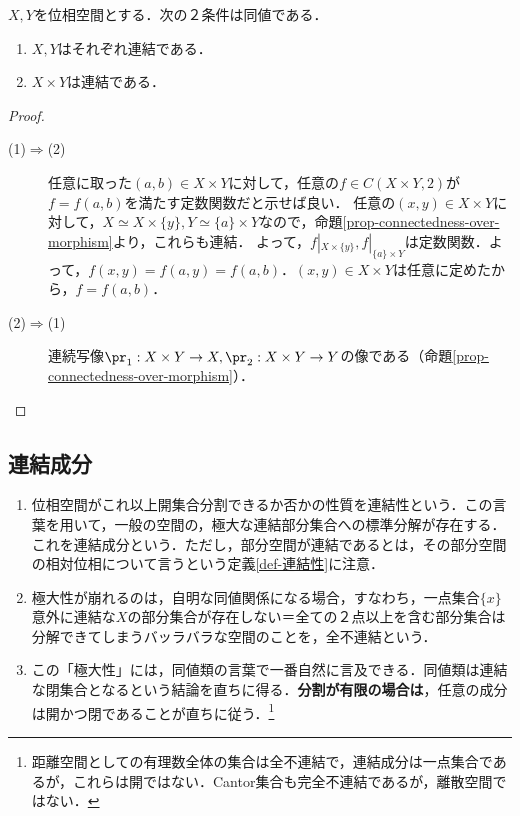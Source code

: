 \documentclass[uplatex,dvipdfmx]{jsreport}
\begin{document}
\begin{corollary}[積への伝播]
    $X,Y$を位相空間とする．次の２条件は同値である．
    \begin{enumerate}
        \item $X,Y$はそれぞれ連結である．
        \item $X\times Y$は連結である．
    \end{enumerate}
\end{corollary}
\begin{proof}\mbox{}
    \begin{description}
        \item[(1)$\Rightarrow$(2)] 
        任意に取った$(a,b)\in X\times Y$に対して，任意の$f\in C(X\times Y,2)$が$f=f(a,b)$を満たす定数関数だと示せば良い．
        任意の$(x,y)\in X\times Y$に対して，$X\simeq X\times\{y\},Y\simeq\{a\}\times Y$なので，命題\ref{prop-connectedness-over-morphism}より，これらも連結．
        よって，$f|_{X\times\{y\}},f|_{\{a\}\times Y}$は定数関数．よって，$f(x,y)=f(a,y)=f(a,b)$．$(x,y)\in X\times Y$は任意に定めたから，$f=f(a,b)$．
        \item[(2)$\Rightarrow$(1)]
        連続写像$\pr_1:X\times Y\to X,\pr_2:X\times Y\to Y$の像である（命題\ref{prop-connectedness-over-morphism}）．
    \end{description}
\end{proof}

\subsection{連結成分}

\begin{tcolorbox}[colframe=ForestGreen, colback=ForestGreen!10!white,breakable,colbacktitle=ForestGreen!40!white,coltitle=black,fonttitle=\bfseries\sffamily,
title=連結成分：連結の中間的・動的な様子を，同値類の言葉で捉える装置．]
    \begin{enumerate}
        \item 位相空間がこれ以上開集合分割できるか否かの性質を連結性という．この言葉を用いて，一般の空間の，極大な連結部分集合への標準分解が存在する．これを連結成分という．ただし，部分空間が連結であるとは，その部分空間の相対位相について言うという定義\ref{def-連結性}に注意．
        \item 極大性が崩れるのは，自明な同値関係になる場合，すなわち，一点集合$\{x\}$意外に連結な$X$の部分集合が存在しない＝全ての２点以上を含む部分集合は分解できてしまうバッラバラな空間のことを，全不連結という．
        \item この「極大性」には，同値類の言葉で一番自然に言及できる．同値類は連結な閉集合となるという結論を直ちに得る．\textbf{分割が有限の場合は}，任意の成分は開かつ閉であることが直ちに従う．\footnote{距離空間としての有理数全体の集合は全不連結で，連結成分は一点集合であるが，これらは開ではない．Cantor集合も完全不連結であるが，離散空間ではない．}
    \end{enumerate}
\end{tcolorbox}
\end{document}
